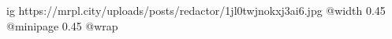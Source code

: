  
 
 
 
 


\ifcmt
  ig https://mrpl.city/uploads/posts/redactor/1jl0twjnokxj3ai6.jpg
  @width 0.45
  @minipage 0.45
  @wrap \parpic[r]
\fi
